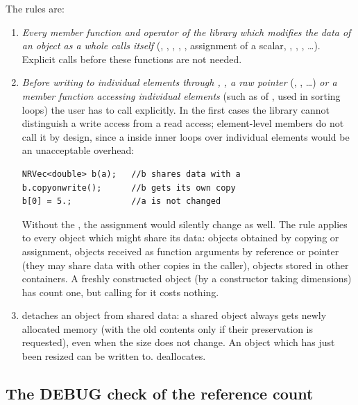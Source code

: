 The rules are:
\begin{enumerate}
\item \emph{Every member function and operator of the library which modifies the data of an object as a whole calls
	 itself} (, , , \code{+=}, \code{*=}, assignment of a
	scalar, , , , \dots). Explicit calls before these
	functions are not needed.
\item \emph{Before writing to individual elements through , , a raw pointer}
	(, , \dots) \emph{or a member function accessing individual elements} (such as
	 of , used in sorting loops) the user has to call  explicitly.
	In the first cases the library cannot distinguish a write access from a read access; element-level members do not call it
	by design, since a  inside inner loops over individual elements would be an unacceptable overhead:
\begin{lstlisting}
NRVec<double> b(a);   //b shares data with a
b.copyonwrite();      //b gets its own copy
b[0] = 5.;            //a is not changed
\end{lstlisting}
	Without the , the assignment would silently change  as well.
	The rule applies to every object which might share its data: objects obtained by copying or assignment,
	objects received as function arguments by reference or pointer (they may share data with other copies in
	the caller), objects stored in other containers. A freshly constructed object (by a constructor taking
	dimensions) has count one, but calling  for it costs nothing.
\item {} detaches an object from shared data: a shared object always gets newly allocated
	memory (with the old contents only if their preservation is requested), even when the size does not change.
	An object which has just been resized can be written to.  deallocates.
\end{enumerate}

\subsection{The DEBUG check of the reference count}

